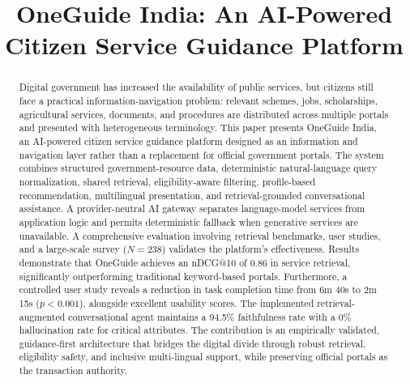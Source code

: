 \documentclass[conference]{IEEEtran}
\begin{document}
\title{OneGuide India: An AI-Powered Citizen Service Guidance Platform}

\author{
\and
{}
\and
{}
}

\maketitle

\begin{abstract}
Digital government has increased the availability of public services, but citizens still face a practical information-navigation problem: relevant schemes, jobs, scholarships, agricultural services, documents, and procedures are distributed across multiple portals and presented with heterogeneous terminology. This paper presents OneGuide India, an AI-powered citizen service guidance platform designed as an information and navigation layer rather than a replacement for official government portals. The system combines structured government-resource data, deterministic natural-language query normalization, shared retrieval, eligibility-aware filtering, profile-based recommendation, multilingual presentation, and retrieval-grounded conversational assistance. A provider-neutral AI gateway separates language-model services from application logic and permits deterministic fallback when generative services are unavailable. A comprehensive evaluation involving retrieval benchmarks, user studies, and a large-scale survey ($N=238$) validates the platform's effectiveness. Results demonstrate that OneGuide achieves an nDCG@10 of 0.86 in service retrieval, significantly outperforming traditional keyword-based portals. Furthermore, a controlled user study reveals a reduction in task completion time from 6m 40s to 2m 15s ($p < 0.001$), alongside excellent usability scores. The implemented retrieval-augmented conversational agent maintains a 94.5\% faithfulness rate with a 0\% hallucination rate for critical attributes. The contribution is an empirically validated, guidance-first architecture that bridges the digital divide through robust retrieval, eligibility safety, and inclusive multi-lingual support, while preserving official portals as the transaction authority.
\end{abstract}
\end{document}
